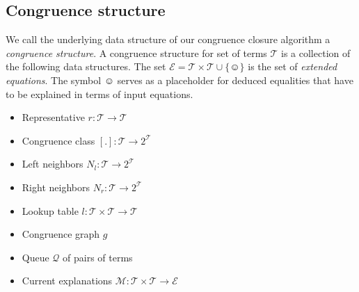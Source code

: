 \subsection*{Congruence structure}

We call the underlying data structure of our congruence closure algorithm a \emph{congruence structure}.
A congruence structure for set of terms $\mathcal{T}$ is a collection of the following data structures.
The set $\mathcal{E} = \mathcal{T} \times \mathcal{T} \cup \{\smiley\}$ is the set of \emph{extended equations}.
The symbol $\smiley$ serves as a placeholder for deduced equalities that have to be explained in terms of input equations.

\begin{itemize}
	\item Representative $r: \mathcal{T} \rightarrow \mathcal{T}$
	\item Congruence class $[.]: \mathcal{T} \rightarrow 2^\mathcal{T}$
	\item Left neighbors $N_l: \mathcal{T} \rightarrow 2^\mathcal{T}$
	\item Right neighbors $N_r: \mathcal{T} \rightarrow 2^\mathcal{T}$
	\item Lookup table $l: \mathcal{T} \times \mathcal{T} \rightarrow \mathcal{T}$
	\item Congruence graph $g$
	\item Queue $\mathcal{Q}$ of pairs of terms
	\item Current explanations $\mathcal{M}: \mathcal{T} \times \mathcal{T} \rightarrow \mathcal{E}$
\end{itemize}

